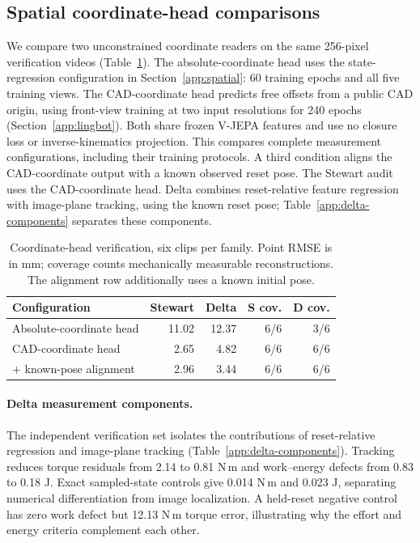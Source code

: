 \subsection{Spatial coordinate-head comparisons}
We compare two unconstrained coordinate readers on the same 256-pixel verification videos (Table~\ref{app:observer-ablation}). The absolute-coordinate head uses the state-regression configuration in Section~\ref{app:spatial}: 60 training epochs and all five training views. The CAD-coordinate head predicts free offsets from a public CAD origin, using front-view training at two input resolutions for 240 epochs (Section~\ref{app:lingbot}). Both share frozen V-JEPA features and use no closure loss or inverse-kinematics projection. This compares complete measurement configurations, including their training protocols. A third condition aligns the CAD-coordinate output with a known observed reset pose. The Stewart audit uses the CAD-coordinate head. Delta combines reset-relative feature regression with image-plane tracking, using the known reset pose; Table~\ref{app:delta-components} separates these components.

\begin{table}[t]
\caption{Coordinate-head verification, six clips per family. Point RMSE is in mm; coverage counts mechanically measurable reconstructions. The alignment row additionally uses a known initial pose.}
\label{app:observer-ablation}
\centering\small
\setlength{\tabcolsep}{3pt}
\begin{tabular}{lrrrr}
\toprule
Configuration & Stewart & Delta & S cov. & D cov.\\
\midrule
Absolute-coordinate head & 11.02 & 12.37 & 6/6 & 3/6 \\
CAD-coordinate head & 2.65 & 4.82 & 6/6 & 6/6 \\
+ known-pose alignment & 2.96 & 3.44 & 6/6 & 6/6 \\
\bottomrule
\end{tabular}
\end{table}

\paragraph{Delta measurement components.}
The independent verification set isolates the contributions of reset-relative regression and image-plane tracking (Table~\ref{app:delta-components}). Tracking reduces torque residuals from 2.14 to 0.81 N\,m and work--energy defects from 0.83 to 0.18 J. Exact sampled-state controls give 0.014 N\,m and 0.023 J, separating numerical differentiation from image localization. A held-reset negative control has zero work defect but 12.13 N\,m torque error, illustrating why the effort and energy criteria complement each other.

